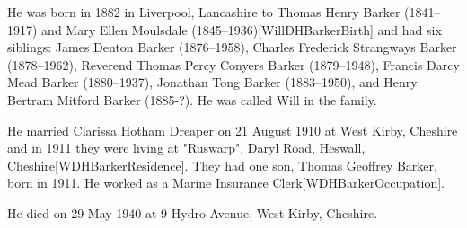 


He was born in 1882 in Liverpool, Lancashire to Thomas Henry Barker (1841--1917) and Mary Ellen Moulsdale (1845--1936)[WillDHBarkerBirth] and had six siblings: James Denton Barker (1876--1958),  Charles Frederick Strangways Barker (1878--1962), Reverend Thomas Percy Conyers Barker (1879--1948), Francis Darcy Mead Barker (1880--1937), Jonathan Tong Barker (1883--1950), and Henry Bertram Mitford Barker (1885-?). He was called Will in the family.

He married Clarissa Hotham Dreaper on 21 August 1910 at West Kirby, Cheshire and in 1911 they were living at  "Ruswarp", Daryl Road, Heswall, Cheshire[WDHBarkerResidence].  They had one son, Thomas Geoffrey Barker, born in 1911.  He worked as a Marine Insurance Clerk[WDHBarkerOccupation].

He died on 29 May 1940 at 9 Hydro Avenue, West Kirby, Cheshire.

